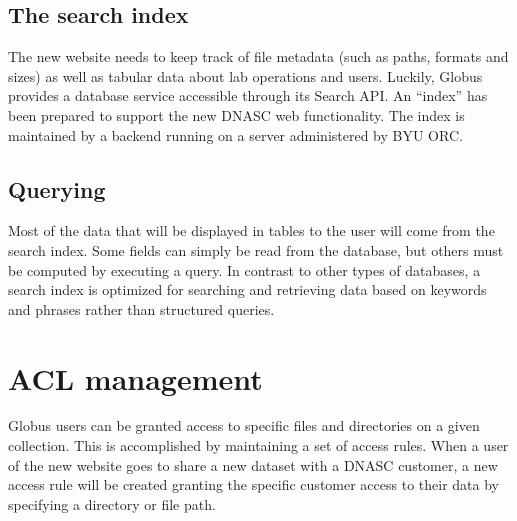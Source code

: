 \subsection{The search index}
The new website needs to keep track of file metadata (such as paths, formats and sizes) 
as well as tabular data about lab operations and users. Luckily, Globus provides a database 
service accessible through its Search API. An “index” has been prepared to support the new 
DNASC web functionality. The index is maintained by a backend running on a server administered 
by BYU ORC.

\subsection{Querying}
Most of the data that will be displayed in tables to the user will come from the search 
index. Some fields can simply be read from the database, but others must be computed by 
executing a query. In contrast to other types of databases, a search index is optimized 
for searching and retrieving data based on keywords and phrases rather than structured 
queries.

\section{ACL management}
Globus users can be granted access to specific files and directories on a given collection. 
This is accomplished by maintaining a set of access rules. When a user of the new website 
goes to share a new dataset with a DNASC customer, a new access rule will be created granting 
the specific customer access to their data by specifying a directory or file path.
